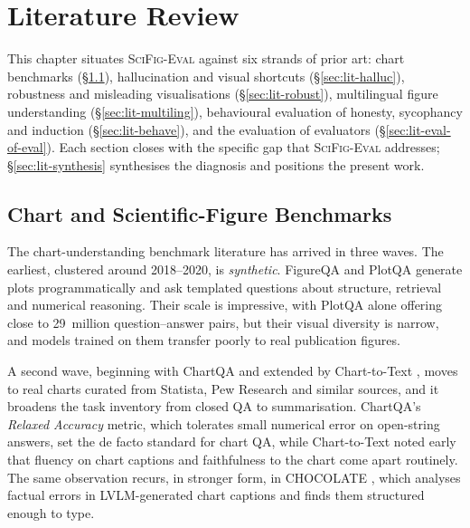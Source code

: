 \chapter{Literature Review\label{chap:litreview}}

This chapter situates \textsc{SciFig-Eval} against six strands of prior art: chart benchmarks (\S\ref{sec:lit-benchmarks}), hallucination and visual shortcuts (\S\ref{sec:lit-halluc}), robustness and misleading visualisations (\S\ref{sec:lit-robust}), multilingual figure understanding (\S\ref{sec:lit-multiling}), behavioural evaluation of honesty, sycophancy and induction (\S\ref{sec:lit-behave}), and the evaluation of evaluators (\S\ref{sec:lit-eval-of-eval}).
Each section closes with the specific gap that \textsc{SciFig-Eval} addresses; \S\ref{sec:lit-synthesis} synthesises the diagnosis and positions the present work.

\section{Chart and Scientific-Figure Benchmarks}
\label{sec:lit-benchmarks}

The chart-understanding benchmark literature has arrived in three
waves. The earliest, clustered around 2018--2020, is
\emph{synthetic}. FigureQA \citep{kahou2018figureqa} and PlotQA
\citep{methani2020plotqa} generate plots programmatically and ask
templated questions about structure, retrieval and numerical
reasoning. Their scale is impressive, with PlotQA alone offering
close to 29~million question--answer pairs, but their visual
diversity is narrow, and models trained on them transfer poorly to
real publication figures.

A second wave, beginning with ChartQA \citep{masry2022chartqa} and
extended by Chart-to-Text \citep{kantharaj2022charttotext}, moves to
real charts curated from Statista, Pew Research and similar sources,
and it broadens the task inventory from closed QA to summarisation.
ChartQA's \emph{Relaxed Accuracy} metric, which tolerates small
numerical error on open-string answers, set the de facto standard
for chart QA, while Chart-to-Text noted early that fluency on chart
captions and faithfulness to the chart come apart routinely. The
same observation recurs, in stronger form, in CHOCOLATE
\citep{huang2024chocolate}, which analyses factual errors in
LVLM-generated chart captions and finds them structured enough to
type.

